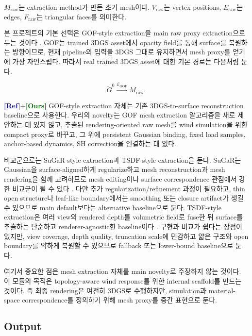 \documentclass[11pt,a4paper]{article}
\newcommand{\refbased}{\textcolor{darkblue}{\textbf{[Ref]}}}
\newcommand{\ours}{\textcolor{darkgreen}{\textbf{[Ours]}}}
\begin{document}
$M_{\mathrm{raw}}$는 extraction method가 만든 초기 mesh이다.
$V_{\mathrm{raw}}$는 vertex positions, $E_{\mathrm{raw}}$는 edges, $F_{\mathrm{raw}}$는 triangular faces를 의미한다.

본 프로젝트의 기본 선택은 GOF-style extraction을 main raw proxy extraction으로 두는 것이다 \cite{yu2024gof}.
GOF는 trained 3DGS asset에서 opacity field를 통해 surface를 복원하는 방향이므로, 현재 pipeline의 입력을 3DGS 그대로 유지하면서 mesh proxy를 얻기에 가장 자연스럽다.
따라서 real trained 3DGS asset에 대한 기본 경로는 다음처럼 둔다.

\begin{equation}
\widetilde{G}^0 \xrightarrow{\mathcal{E}_{\mathrm{GOF}}} M_{\mathrm{raw}}.
\end{equation}

\noindent\refbased\;+\;\ours\;
GOF-style extraction 자체는 기존 3DGS-to-surface reconstruction baseline으로 사용한다.
우리의 novelty는 GOF mesh extraction 알고리즘을 새로 제안하는 데 있지 않고, 추출된 rendering-oriented raw mesh를 wind simulation을 위한 compact proxy로 바꾸고, 그 위에 persistent Gaussian binding, fixed load samples, anchor-based dynamics, SH correction을 연결하는 데 있다.

비교군으로는 SuGaR-style extraction과 TSDF-style extraction을 둔다.
SuGaR는 Gaussian을 surface-aligned하게 regularize하고 mesh reconstruction과 mesh rendering을 함께 고려하므로 mesh editing이나 surface correspondence 관점에서 강한 비교군이 될 수 있다 \cite{guedon2024sugar}.
다만 추가 regularization/refinement 과정이 필요하고, thin open structure나 leaf-like boundary에서는 smoothing 또는 closure artifact가 생길 수 있으므로 main default보다는 alternative baseline으로 둔다.
TSDF-style extraction은 여러 view의 rendered depth를 volumetric field로 fuse한 뒤 surface를 추출하는 단순하고 renderer-agnostic한 baseline이다 \cite{curless1996volumetric}.
구현과 비교가 쉽다는 장점이 있지만, view coverage, depth quality, truncation scale에 민감하고 얇은 구조와 open boundary를 약하게 복원할 수 있으므로 fallback 또는 lower-bound baseline으로 둔다.

여기서 중요한 점은 mesh extraction 자체를 main novelty로 주장하지 않는 것이다.
이 모듈의 목적은 topology-aware wind response를 위한 internal scaffold를 만드는 것이다.
즉 최종 rendering은 여전히 3DGS로 수행하지만, simulation과 material-space correspondence를 정의하기 위해 mesh proxy를 중간 표현으로 둔다.

\subsection*{Output}
\end{document}

